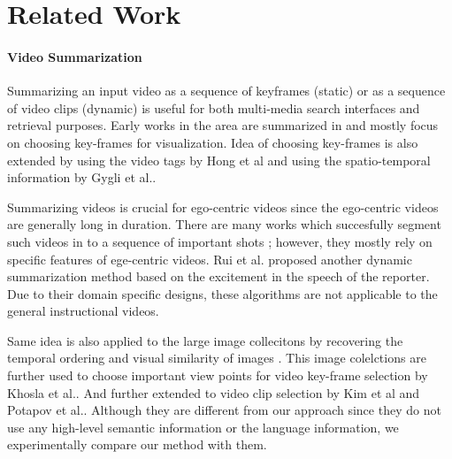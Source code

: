 \section{Related Work}
\paragraph{Video Summarization}
Summarizing an input video as a sequence of keyframes (static) or as a sequence of video clips (dynamic) is useful for both multi-media search interfaces and retrieval purposes. Early works in the area are summarized in \cite{vidAbstraction} and mostly focus on choosing key-frames for visualization. Idea of choosing key-frames is also extended by using the video tags by Hong et al\cite{beyondSearch} and using the spatio-temporal information by Gygli et al.\cite{createSum}.

Summarizing videos is crucial for ego-centric videos since the ego-centric videos are generally long in duration. There are many works which succesfully segment such videos in to a sequence of important shots \cite{lee2012discovering, lu2013story}; however, they mostly rely on specific features of ege-centric videos. Rui et al. \cite{rui2000automatically} proposed another dynamic summarization method based on the excitement in the speech of the reporter. Due to their domain specific designs, these algorithms are not applicable to the general instructional videos.

Same idea is also applied to the large image collecitons by recovering the temporal ordering and visual similarity of images \cite{storyGraph}. This image colelctions are further used to choose important view points for video key-frame selection by Khosla et al.\cite{khosla2013large}. And further extended to video clip selection by Kim et al\cite{kim2014joint} and Potapov et al.\cite{potapov2014category}. Although they are different from our approach since they do not use any high-level semantic information or the language information, we experimentally compare our method with them.

